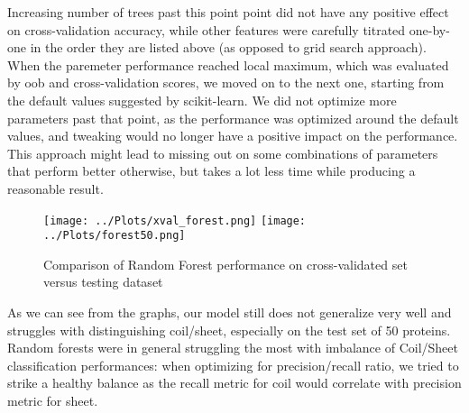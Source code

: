 \documentclass[12pt]{article}
\begin{document}
\noindent Increasing number of trees past this point point did not have any positive effect on cross-validation accuracy, while other features were carefully titrated one-by-one in the order they are listed above (as opposed to grid search approach).\\ When the paremeter performance reached local maximum, which was evaluated by oob and cross-validation scores, we moved on to the next one, starting from the default values suggested by scikit-learn. We did not optimize more parameters past that point, as the performance was optimized around the default values, and tweaking would no longer have a positive impact on the performance. This approach might lead to missing out on some combinations of parameters that perform better otherwise, but takes a lot less time while producing a reasonable result. \\
\begin{figure}[H]
\hspace*{-0.6in}
\texttt{[image: ../Plots/xval\_forest.png]}
\hspace*{-0.6in} 
\texttt{[image: ../Plots/forest50.png]} 
\caption{Comparison of Random Forest performance on cross-validated set versus testing dataset}
\end{figure}

\noindent As we can see from the graphs, our model still does not generalize very well and struggles with distinguishing coil/sheet, especially on the test set of 50 proteins. Random forests were in general struggling the most with imbalance of Coil/Sheet classification performances: when optimizing for precision/recall ratio, we tried to strike a healthy balance as the recall metric for coil would correlate with precision metric for sheet.
\end{document}
